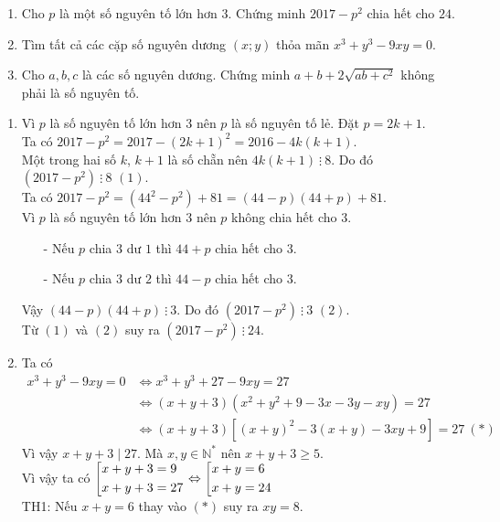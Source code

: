 \begin{ex}%
\hfill 
    \begin{enumerate}    
        \item Cho $p$ là một số nguyên tố lớn hơn $3$. Chứng minh $2017 -p^2$ chia hết cho $24$.
        \item Tìm tất cả các cặp số nguyên dương $(x;y)$ thỏa mãn $x^3+y^3-9xy=0$.
        \item Cho $a,b,c$ là các số nguyên dương. Chứng minh $a+b+2\sqrt{ab+c^2}$ không phải là số nguyên tố. 
    \end{enumerate}
\loigiai
    {
    \begin{enumerate}
    	\item Vì $p$ là số nguyên tố lớn hơn $3$ nên $p$ là số nguyên tố lẻ. Đặt $p=2k+1$. \\
    	Ta có $2017-p^2=2017-(2k+1)^2=2016-4k(k+1)$. \\
    	Một trong hai số $k$, $k+1$ là số chẵn nên $4k(k+1) ~ \vdots ~ 8$. Do đó $(2017-p^2) ~ \vdots ~ 8$ $(1)$.
    	\\ Ta có $2017-p^2=(44^2-p^2) +81 =(44-p)(44+p)+81$. 
    	\\ Vì $p$ là số nguyên tố lớn hơn $3$ nên $p$ không chia hết cho $3$.
    	\begin{itemize}
    		\item[-] Nếu $p$ chia $3$ dư $1$ thì $44+p$ chia hết cho $3$.
    		\item[-] Nếu $p$ chia $3$ dư $2$ thì $44-p$ chia hết cho $3$.
    	\end{itemize}
    	Vậy $(44-p)(44+p) ~ \vdots ~ 3$. Do đó $(2017 -p^2) ~ \vdots ~3$ $(2)$.
    	\\ Từ $(1)$ và $(2)$ suy ra $(2017-p^2) ~ \vdots ~ 24$.
    	\item Ta có 
    	\begin{align*}
    	x^3+y^3-9xy=0 &\Leftrightarrow x^3+y^3+27-9xy=27\\ &\Leftrightarrow (x+y+3)(x^2+y^2+9-3x-3y-xy)=27 
    	\\ & \Leftrightarrow (x+y+3)\left[ (x+y)^2-3(x+y) -3xy+9 \right]=27~(*)
    	\end{align*}
    	Vì vậy $x+y+3 \mid 27$. Mà $x,y \in \mathbb{N}^*$ nên $x+y+3 \geq 5$.
    	\\ Vì vậy ta có $\left[\begin{aligned}x+y+3&=9 \\ x+y+3&=27\end{aligned}\right. \Leftrightarrow \left[\begin{aligned}x+y&=6 \\ x+y&=24\end{aligned}\right.$
    	\\ TH1: Nếu $x+y=6$ thay vào $(*)$ suy ra $xy=8$.

\end{enumerate}}
\end{ex}
